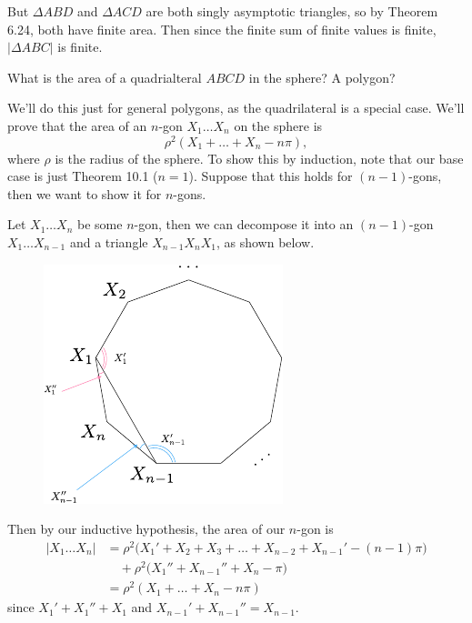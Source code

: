 \documentclass[twoside,10pt]{article}
\begin{document}
But $\Delta ABD$ and $\Delta ACD$ are both singly asymptotic triangles, so by Theorem 6.24, both have finite area. Then since the finite sum of finite values is finite, $|\Delta ABC|$ is finite.

\newpage

\begin{exer}[10.2]
What is the area of a quadrialteral $ABCD$ in the sphere? A polygon?
\end{exer}

We'll do this just for general polygons, as the quadrilateral is a special case. We'll prove that the area of an $n$-gon $X_1 \dots X_n$ on the sphere is
\[
	\rho^2 (X_1 + \dots + X_n - n\pi),
\] where $\rho$ is the radius of the sphere. To show this by induction, note that our base case is just Theorem 10.1 ($n=1$). Suppose that this holds for $(n-1)$-gons, then we want to show it for $n$-gons.

Let $X_1 \dots X_n$ be some $n$-gon, then we can decompose it into an $(n-1)$-gon $X_1 \dots X_{n-1}$ and a triangle $X_{n-1}X_{n}X_1$, as shown below.

\begin{figure}[H]
	\centering
	\includegraphics[scale=1.4]{fig/2.pdf}
\end{figure}

Then by our inductive hypothesis, the area of our $n$-gon is
\begin{align*}
	|X_1 \dots X_n| &= \rho^2\big(X_1'+ X_2 + X_3 + \dots + X_{n-2}+X_{n-1}' - (n-1)\pi \big) \\
			& \quad + \rho^2 \big( X_1'' + X_{n-1}'' + X_n - \pi\big) \\
			&= \rho^2 (X_1 + \dots + X_n - n \pi)
\end{align*}
since $X_1' + X_1'' + X_1$ and $X_{n-1}'+X_{n-1}'' = X_{n-1}$.
\end{document}
